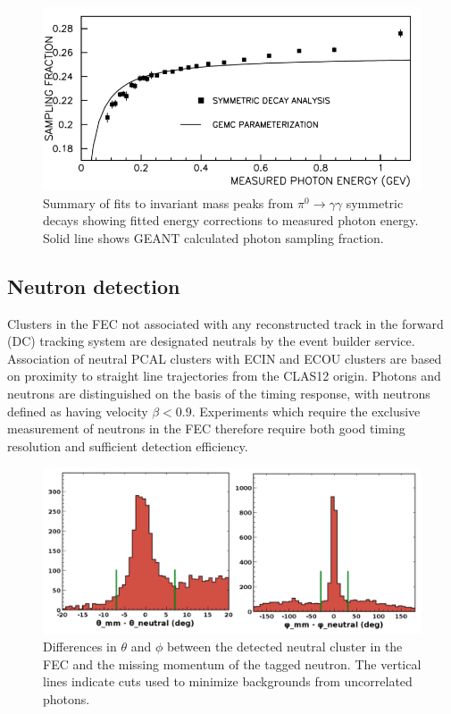 \begin{figure}[h]
\centering
\includegraphics[width=1.0\columnwidth,keepaspectratio]{img/fx-study-summary-2.png}
\caption[]{Summary of fits to invariant mass peaks from $\pi^0 \rightarrow \gamma \gamma$ symmetric decays showing fitted energy corrections to measured photon energy.  Solid line shows GEANT calculated photon sampling fraction.}
\label{fig:fx-study-summary-2}
\end{figure}

\subsection{Neutron detection}
Clusters in the FEC not associated with any reconstructed track in the forward (DC) tracking system are designated neutrals by the event builder service.  Association of neutral PCAL clusters with ECIN and ECOU clusters are based on proximity to straight line trajectories from the CLAS12 origin.  Photons and neutrons are distinguished on the basis of the timing response, with neutrons defined as having velocity $\beta < 0.9$.  Experiments which require the exclusive measurement of neutrons in the FEC therefore require both good timing resolution and sufficient detection efficiency. 



\begin{figure}[h]
\centering
\includegraphics[width=1.0\columnwidth,keepaspectratio]{img/S10_4_1.png}
\caption[]{Differences in $\theta$ and $\phi$ between the detected neutral cluster in the FEC and the missing momentum of the tagged neutron.  The vertical lines indicate cuts used to minimize backgrounds from uncorrelated photons.}
\label{fig:S10_4_1}
\end{figure}

